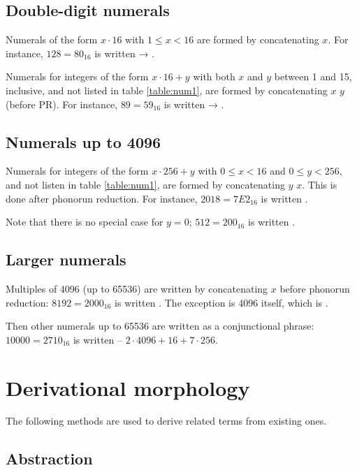 \documentclass{book}
\begin{document}
\section{Double-digit numerals}

Numerals of the form $x \cdot 16$ with $1 \le x < 16$ are formed by concatenating  $x$. For instance, $128 = 80_{16}$ is written  → .

Numerals for integers of the form $x \cdot 16 + y$ with both $x$ and $y$ between 1 and 15, inclusive, and not listed in table \ref{table:num1}, are formed by concatenating $x$  $y$  (before PR). For instance, $89 = 59_{16}$ is written  → .

\section{Numerals up to 4096}

Numerals for integers of the form $x \cdot 256 + y$ with $0 \le x < 16$ and $0 \le y < 256$, and not listen in table \ref{table:num1}, are formed by concatenating $y$  $x$. This is done after phonorun reduction. For instance, $2018 = 7E2_{16}$ is written .

Note that there is no special case for $y = 0$; $512 = 200_{16}$ is written .

\section{Larger numerals}

Multiples of 4096 (up to 65536) are written by concatenating  $x$ before phonorun reduction: $8192 = 2000_{16}$ is written . The exception is 4096 itself, which is .

Then other numerals up to 65536 are written as a conjunctional phrase: $10000 = 2710_{16}$ is written  -- $2 \cdot 4096 + 16 + 7 \cdot 256$.

\chapter{Derivational morphology}

The following methods are used to derive related terms from existing ones.

\section{Abstraction}
\end{document}
